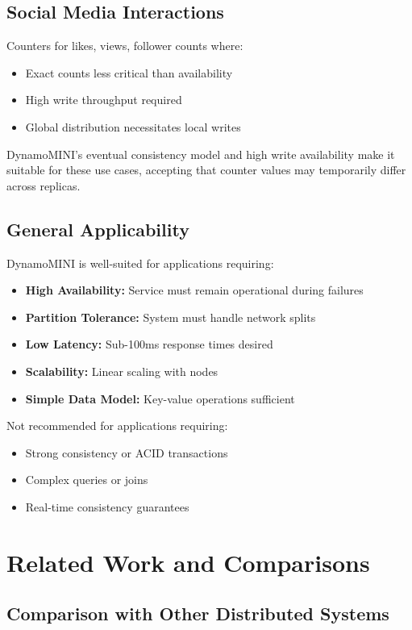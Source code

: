 \documentclass[conference]{IEEEtran}
\begin{document}
\subsection{Social Media Interactions}
Counters for likes, views, follower counts where:
\begin{itemize}
    \item Exact counts less critical than availability
    \item High write throughput required
    \item Global distribution necessitates local writes
\end{itemize}

DynamoMINI's eventual consistency model and high write availability make it suitable for these use cases, accepting that counter values may temporarily differ across replicas.

\subsection{General Applicability}
DynamoMINI is well-suited for applications requiring:
\begin{itemize}
    \item \textbf{High Availability:} Service must remain operational during failures
    \item \textbf{Partition Tolerance:} System must handle network splits
    \item \textbf{Low Latency:} Sub-100ms response times desired
    \item \textbf{Scalability:} Linear scaling with nodes
    \item \textbf{Simple Data Model:} Key-value operations sufficient
\end{itemize}

Not recommended for applications requiring:
\begin{itemize}
    \item Strong consistency or ACID transactions
    \item Complex queries or joins
    \item Real-time consistency guarantees
\end{itemize}

\section{Related Work and Comparisons}

\subsection{Comparison with Other Distributed Systems}
\end{document}

